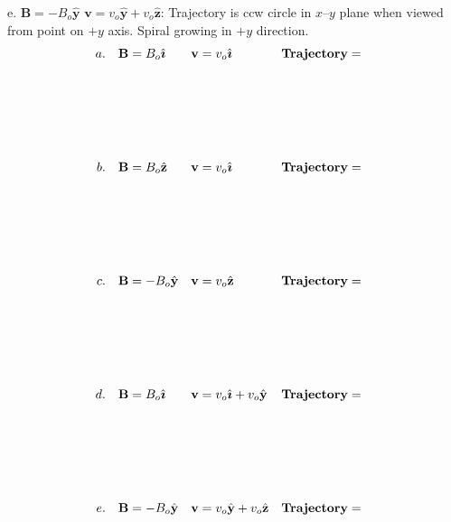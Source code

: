 \documentclass{article}
\newcommand{\ihat}[0]{\hat{\boldsymbol{\imath}}}
\newcommand{\yhat}[0]{\hat{\mathbf{y}}}
\newcommand{\zhat}[0]{\hat{\mathbf{z}}}
\begin{document}
e. $\mathbf{B} = -B_o\yhat$ $\mathbf{v} = v_o\yhat+v_o\zhat$: Trajectory is ccw circle in $x$--$y$ plane when viewed from point on $+y$ axis. Spiral growing in $+y$ direction.
\else
\begin{equation}
\begin{align*}
a.\quad & \mathbf{B} =  B_o\ihat&  \mathbf{v} &= v_o\ihat & & \bf{Trajectory =} \\\\\\\\ \\\\
b.\quad & \mathbf{B} =  B_o\zhat &  \mathbf{v} & = v_o\ihat& &  \bf{Trajectory =} \\\\\\\\ \\\\
c.\quad  & \mathbf{B} = -B_o\yhat & \mathbf{v} & = v_o\zhat& & \bf{Trajectory =} \\\\\\\\ \\\\
d.\quad  & \mathbf{B} = B_o\ihat & \mathbf{v} & = v_o\ihat+v_o\yhat& &\bf{Trajectory =}\\\\\\\\ \\\\
e.\quad  & \mathbf{B} = -B_o\yhat & \mathbf{v} & = v_o\yhat+v_o\zhat& & \bf{Trajectory =} & 
\end{align*}
\end{equation}
\fi
\ifsolutions\else
\end{document}
